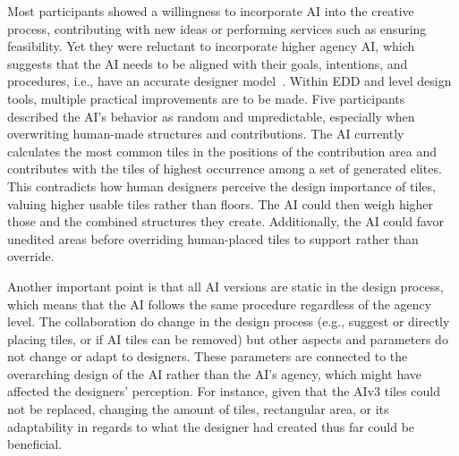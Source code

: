 Most participants showed a willingness to incorporate AI into the creative process, contributing with new ideas or performing services such as ensuring feasibility. Yet they were reluctant to incorporate higher agency AI, which suggests that the AI needs to be aligned with their goals, intentions, and procedures, i.e., have an accurate designer model~. Within EDD and level design tools, multiple practical improvements are to be made. Five participants described the AI's behavior as random and unpredictable, especially when overwriting human-made structures and contributions. The AI currently calculates the most common tiles in the positions of the contribution area and contributes with the tiles of highest occurrence among a set of generated elites. This contradicts how human designers perceive the design importance of tiles, valuing higher usable tiles rather than floors. The AI could then weigh higher those and the combined structures they create. Additionally, the AI could favor unedited areas before overriding human-placed tiles to support rather than override. 

Another important point is that all AI versions are static in the design process, which means that the AI follows the same procedure regardless of the agency level. The collaboration do change in the design process (e.g., suggest or directly placing tiles, or if AI tiles can be removed) but other aspects and parameters do not change or adapt to designers. These parameters are connected to the overarching design of the AI rather than the AI's agency, which might have affected the designers' perception. For instance, given that the AIv3 tiles could not be replaced, changing the amount of tiles, rectangular area, or its adaptability in regards to what the designer had created thus far could be beneficial.



